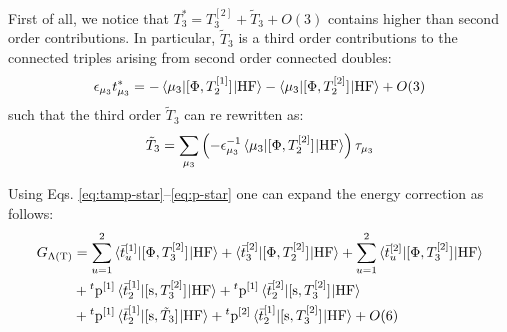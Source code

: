 First of all, we notice that $T_3^{*} = T_3^{[2]} + \tilde{T}_3 + O(3)$
contains higher than second order contributions. In particular, $\tilde{T}_3$
is a third order contributions to the connected triples arising from
second order connected doubles:
\begin{equation}
  \epsilon_{\mu_3}t_{\mu_3}^{*} =
  - \braket{\mu_3 |[ \Phi, T_2^{[1]} ]^{} | \mathrm{HF}}
  - \braket{\mu_3 | [ \Phi, T_2^{[2]} ]^{} | \mathrm{HF}}
  + O(3)
\end{equation}
such that the third order $\tilde{T}_3$ can re rewritten as:
\begin{equation}
  \tilde{T}_3
  = \sum_{\mu_3}
  \left(-\epsilon_{\mu_3}^{-1}\braket{\mu_3 |
  [ \Phi, T_2^{[2]} ]^{}
  | \mathrm{HF}}\right)
  \tau_{\mu_3}
\end{equation}

Using Eqs. \eqref{eq:tamp-star}--\eqref{eq:p-star} one can expand the
energy correction as follows:
\begin{equation}
  \begin{aligned}
  G_{\Lambda(\text{T})} &=
  \sum_{u=1}^2 \braket{\bar{t}_{u}^{[1]} | [ \Phi, T_3^{[2]} ]^{} | \mathrm{HF}}
  +
  \braket{\bar{t}_{3}^{[2]} | [ \Phi, T_2^{[2]} ]^{} | \mathrm{HF}}
  +
  \sum_{u=1}^2 \braket{\bar{t}_{u}^{[2]} | [ \Phi, T_3^{[2]} ]^{} | \mathrm{HF}}
  \\
  &+
  {}^t\mathrm{p}^{[1]} \braket{\bar{t}_{2}^{[1]} | [ \mathrm{s}, T_3^{[2]} ]^{} | \mathrm{HF}}
  +
  {}^t\mathrm{p}^{[1]} \braket{\bar{t}_{2}^{[2]} | [ \mathrm{s}, T_3^{[2]} ]^{} | \mathrm{HF}}
   \\
  &+
  {}^t\mathrm{p}^{[1]} \braket{\bar{t}_{2}^{[1]} | [ \mathrm{s}, \tilde{T}_3 ]^{} | \mathrm{HF}}
  +
  {}^t\mathrm{p}^{[2]} \braket{\bar{t}_{2}^{[1]} | [ \mathrm{s}, T_3^{[2]} ]^{} | \mathrm{HF}}
  + O(6)
  \end{aligned}
\end{equation}

